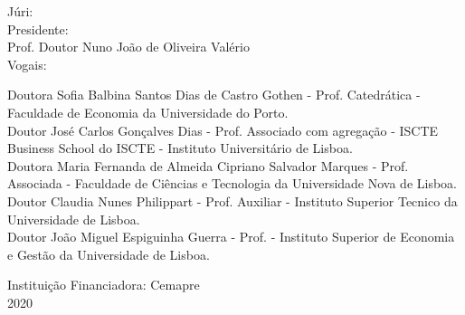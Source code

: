 \begin{titlepage}
\begin{center}
\noindent
\begin{flushleft} \footnotesize
Júri:\\[0.1cm]
Presidente:\\
Prof. Doutor Nuno João de Oliveira Valério\\[0.1cm]
Vogais:\\
\begin{adjustwidth}{0pt}{-50pt}
Doutora Sofia Balbina Santos Dias de Castro Gothen - Prof. Catedrática - Faculdade de Economia da Universidade do Porto. \\
Doutor José Carlos Gonçalves Dias - Prof. Associado com agregação - ISCTE Business School do ISCTE - Instituto Universitário de Lisboa.\\
Doutora Maria Fernanda de Almeida Cipriano Salvador Marques - Prof. Associada - Faculdade de Ciências e Tecnologia da Universidade Nova de Lisboa.\\ 
Doutor Claudia Nunes Philippart - Prof. Auxiliar - Instituto Superior Tecnico da Universidade de Lisboa.\\
Doutor João Miguel Espiguinha Guerra - Prof. - Instituto Superior de Economia e Gestão da Universidade de Lisboa.
\end{adjustwidth} 
\end{flushleft}
\vspace{0.5em}

{Instituição Financiadora:  Cemapre}\\
\vspace{1.5em}
{\large 2020}\\[0.1cm]

\end{center}
\end{titlepage}